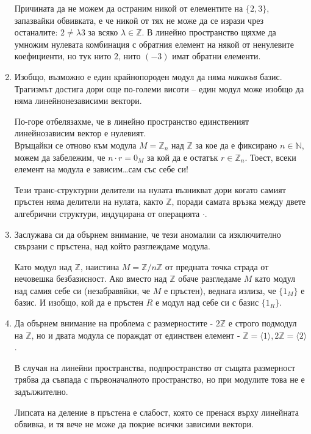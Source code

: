 \documentclass{article}
\newif\ifusemulticols
\theoremstyle{definition}
\theoremstyle{remark}
\theoremstyle{plain}
\theoremstyle{plain}
\newenvironment{mymulticols}
    { \ifusemulticols \begin{multicols}{2} \fi }
    { \ifusemulticols \end{multicols} \fi }
\newcommand{\N}{\mathbb{N}}
\newcommand{\Z}{\mathbb{Z}}
\begin{document}
\begin{mymulticols}
\begin{enumerate}
        Причината да не можем да остраним никой от елементите на $\{ 2, 3 \}$, запазвайки обвивката,
        е че никой от тях не може да се изрази чрез останалите: $2 \not= \lambda 3$ за всяко
        $\lambda \in \Z$.
        В линейно пространство щяхме да умножим нулевата комбинация с обратния елемент на някой от
        ненулевите коефициенти, но тук нито $2$, нито $(-3)$ имат обратни елементи.

    \item Изобщо, възможно е един крайнопороден модул да няма \emph{никакъв} базис.
        Трагизмът достига дори още по-големи висоти -- един модул може изобщо да няма
        линейнонезависими вектори.

        По-горе отбелязахме, че в линейно пространство единственият линейнозависим вектор е
        нулевият.\\ Връщайки се отново към модула $M = \Z_n$ над $\Z$ за кое да е фиксирано $n \in
        \N$, можем да забележим, че $n \cdot r = 0_M$ за кой да е остатък $r \in \Z_n$.  Тоест,
        всеки елемент на модула е зависим\ldots сам със себе си!

        Тези транс-структурни делители на нулата възникват дори когато самият пръстен няма делители
        на нулата, както $\Z$, поради самата връзка между двете алгебрични структури, индуцирана от
        операцията $\cdot$.

    \item Заслужава си да обърнем внимание, че тези аномалии са изключително свързани с пръстена,
        над който разглеждаме модула.

        Като модул над $\Z$, наистина $M = \Z/n\Z$ от предната точка страда от нечовешка
        безбазисност.
        Ако вместо над $\Z$ обаче разгледаме $M$ като модул над самия себе си (незабравяйки, че $M$
        е пръстен), веднага излиза, че $\{1_M\}$ е базис.
        И изобщо, кой да е пръстен $R$ е модул над себе си с базис $\{ 1_R \}$.

    \item Да обърнем внимание на проблема с размерностите - $2\Z$ е строго подмодул на $\Z$, но и
        двата модула се пораждат от единствен елемент - $\Z = \langle 1 \rangle, 2\Z = \langle 2
        \rangle$.

        В случая на линейни пространства, подпространство от същата размерност трябва да съвпада с
        първоначалното пространство, но при модулите това не е задължително.

        Липсата на деление в пръстена е слабост, която се пренася върху линейната обвивка, и тя вече
        не може да покрие всички зависими вектори.


\end{enumerate}
\end{mymulticols}
\end{document}
